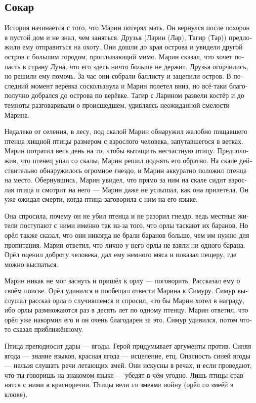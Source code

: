 \documentclass[a4paper,12pt,fleqn]{book}\usepackage{polyglossia}\setdefaultlanguage[babelshorthands=true]{russian}\setotherlanguage{english}\defaultfontfeatures{Ligatures=TeX,Mapping=tex-text}\usepackage{xcolor}\newcommand{\ml}[3]{#2}
\begin{document}
{\subsection{Сокар}

История начинается с того, что Марин потерял мать.
Он вернулся после похорон в пустой дом и не знал, чем заняться.
Друзья (Ларин (Лар), Тагир (Тар)) предложили ему отправиться на охоту.
Они дошли до края острова и увидели другой остров с большим городом, проплывающий мимо.
Марин сказал, что хочет попасть в страну Луна, что его здесь ничто больше не держит.
Друзья огорчились, но решили ему помочь.
За час они собрали баллисту и зацепили остров.
В последний момент верёвка соскользнула и Марин полетел вниз, но всё-таки благополучно добрался до острова по верёвке.
Тагир с Ларином развели костёр и до темноты разговаривали о происшедшем, удивляясь неожиданной смелости Марина.

Недалеко от селения, в лесу, под скалой Марин обнаружил жалобно пищавшего птенца хищной птицы размером с взрослого человека, запутавшегося в ветках.
Марин потратил весь день на то, чтобы вытащить несчастную птицу.
Предположив, что птенец упал со скалы, Марин решил поднять его обратно.
На скале действительно обнаружилось огромное гнездо, и Марин аккуратно положил птенца на место.
Обернувшись, Марин увидел, что прямо за ним на скале сидит взрослая птица и смотрит на него --- Марин даже не услышал, как она прилетела.
Он уже ожидал смерти, когда птица заговорила с ним на его языке.

Она спросила, почему он не убил птенца и не разорил гнездо, ведь местные жители поступают с ними именно так из-за того, что орлы таскают их баранов.
Но орёл также сказал, что они никогда не брали баранов больше, чем им нужно для пропитания.
Марин ответил, что лично у него орлы не взяли ни одного барана.
Орёл оценил доброту человека, дал ему немного мяса и показал пещеру, где можно выспаться.

Марин никак не мог заснуть и пришёл к орлу --- поговорить.
Рассказал ему о своём поиске.
Орёл удивился и пообещал отвести Марина к Симуру.
Симур выслушал рассказ орла о случившемся и спросил, что бы Марин хотел в награду, ибо орлы размножаются раз в десять лет по одному птенцу.
Марин ответил, что орёл уже накормил его и он очень благодарен за это.
Симур удивился, потом что-то сказал приближённому.

Птица преподносит дары --- ягоды.
Герой придумывает аргументы против.
Синяя ягода --- знание языков, красная ягода --- исцеление, етц.
Опасность синей ягоды --- нельзя слушать речи летающих змей.
Они искусны в речах, и если проведают, что ты говоришь на знакомом языке --- убедят в чём угодно.
Лишь птицы сравнятся с ними в красноречии.
Птицы вели со змеями войну (орёл со змеёй в клюве).

}
\end{document}
